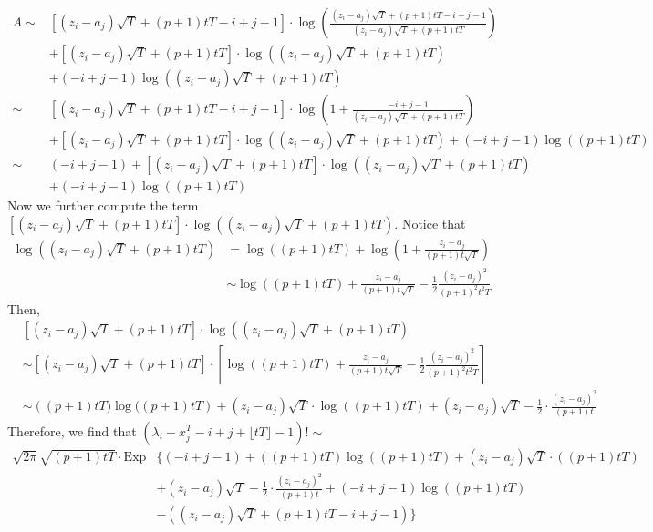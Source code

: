 \documentclass[12pt]{article}
\begin{document}
\begin{align*}
A\sim&\left[(z_{i}-a_{j})\sqrt{T}+(p+1)tT-i+j-1\right]\cdot\log\left(\frac{(z_{i}-a_{j})\sqrt{T}+(p+1)tT-i+j-1}{(z_{i}-a_{j})\sqrt{T}+(p+1)tT}\right)\\&+\left[(z_{i}-a_{j})\sqrt{T}+(p+1)tT\right]\cdot \log\left((z_{i}-a_{j})\sqrt{T}+(p+1)tT\right)\\
	& +(-i+j-1)\log\left((z_{i}-a_{j})\sqrt{T}+(p+1)tT\right)\\
	\sim & \left[(z_{i}-a_{j})\sqrt{T}+(p+1)tT-i+j-1\right]\cdot \log\left(1+\frac{-i+j-1}{(z_{i}-a_{j})\sqrt{T}+(p+1)tT}\right)\\
	& +\left[(z_{i}-a_{j})\sqrt{T}+(p+1)tT\right]\cdot
	\log\left((z_{i}-a_{j})\sqrt{T}+(p+1)tT\right)+ (-i+j-1)\log\left((p+1)tT\right)\\
	\sim&  \left(-i+j-1\right) + \left[(z_{i}-a_{j})\sqrt{T}+(p+1)tT\right]\cdot \log\left((z_{i}-a_{j})\sqrt{T}+(p+1)tT\right)\\&+(-i+j-1)\log\left((p+1)tT\right)
\end{align*}
Now we further compute the term $\left[(z_{i}-a_{j})\sqrt{T}+(p+1)tT\right]\cdot \log\left((z_{i}-a_{j})\sqrt{T}+(p+1)tT\right)$. Notice that
\begin{align*}
	\log\left((z_{i}-a_{j})\sqrt{T}+(p+1)tT\right)&= \log\left((p+1)tT\right)+\log\left(1+\frac{z_{i}-a_{j}}{(p+1)t\sqrt{T}}\right)\\
	&\sim \log((p+1)tT)+\frac{z_{i}-a_{j}}{(p+1)t\sqrt{T}}-\frac{1}{2}\frac{(z_{i}-a_{j})^2}{(p+1)^{2}t^{2}T}
\end{align*}
Then, 
\begin{align*}
	& \left[(z_{i}-a_{j})\sqrt{T}+(p+1)tT\right]\cdot \log\left((z_{i}-a_{j})\sqrt{T}+(p+1)tT\right)\\
	&\sim\left[(z_{i}-a_{j})\sqrt{T}+(p+1)tT\right]\cdot \left[\log((p+1)tT)+\frac{z_{i}-a_{j}}{(p+1)t\sqrt{T}}-\frac{1}{2}\frac{(z_{i}-a_{j})^2}{(p+1)^{2}t^{2}T}\right]\\
	&\sim \left((p+1)tT)\log((p+1)tT\right)+(z_{i}-a_{j})\sqrt{T}\cdot \log((p+1)tT)+(z_{i}-a_{j})\sqrt{T}-\frac{1}{2}\cdot\frac{(z_{i}-a_{j})^2}{(p+1)t}
\end{align*}
Therefore, we find that $(\lambda_{i}-x_{j}^{T}-i+j+\lfloor tT \rfloor -1)!\sim$
\begin{align*}
	\sqrt{2\pi}\sqrt{(p+1)tT}\cdot \text{Exp}&\{(-i+j-1) + ((p+1)tT)\log((p+1)tT)+(z_{i}-a_{j})\sqrt{T}\cdot ((p+1)tT)\\
	&+(z_{i}-a_{j})\sqrt{T}-\frac{1}{2}\cdot\frac{(z_{i}-a_{j})^2}{(p+1)t}+(-i+j-1)\log((p+1)tT)\\&-\left((z_{i}-a_{j})\sqrt{T} + (p+1)tT-i+j-1\right)\}
\end{align*}
\end{document}
